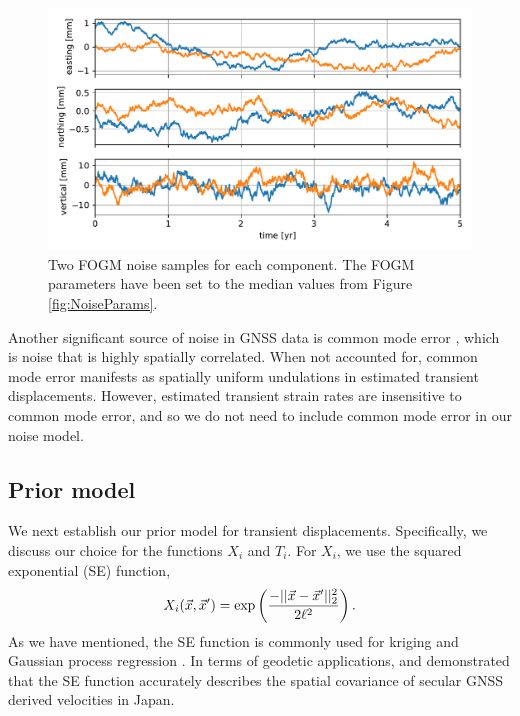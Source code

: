 \documentclass[extra,mreferee]{gji}
\begin{document}
\begin{figure}
\includegraphics{figures/noise/noise-samples.pdf}
\caption{
Two FOGM noise samples for each component. The FOGM parameters
have been set to the median values from Figure \ref{fig:NoiseParams}.
}   
\label{fig:NoiseSamples}
\end{figure}


Another significant source of noise in GNSS data is common mode error
\citep[e.g.,][]{Wdowinski1997,Dong2006}, which is noise that is highly
spatially correlated. When not accounted for, common mode error
manifests as spatially uniform undulations in estimated transient
displacements. However, estimated transient strain rates are
insensitive to common mode error, and so we do not need to include
common mode error in our noise model.

\subsection{Prior model}\label{sec:SignalModel}


We next establish our prior model for transient displacements.
Specifically, we discuss our choice for the functions $X_i$ and $T_i$.
For $X_i$, we use the squared exponential (SE) function,
\begin{equation}\label{eq:SE}
X_i(\vec{x},\vec{x}') = \exp\left(\frac{-||\vec{x} - \vec{x}'||_2^2}{2 \ell^2}\right).
\end{equation}
As we have mentioned, the SE function is commonly used for kriging
\citep[e.g,][]{Cressie1992} and Gaussian process regression
\citep[e.g.,][]{Rasmussen2006}. In terms of geodetic applications,
\citet{Kato1998} and \cite{El-Fiky1999} demonstrated that the SE
function accurately describes the spatial covariance of secular GNSS
derived velocities in Japan. 
\end{document}
